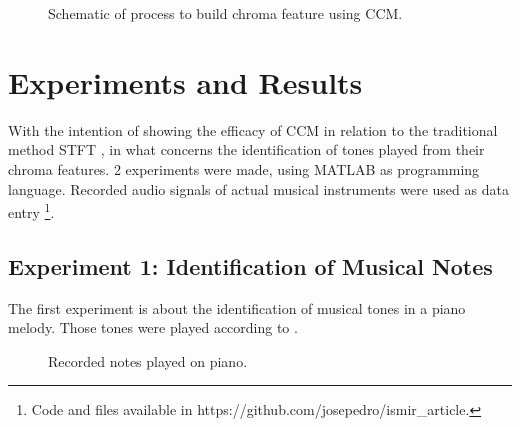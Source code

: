 \documentclass{article}
\begin{document}
	\begin{figure}[h!]
	 \centerline{}
	 \caption{Schematic of process to build chroma feature using CCM.}
	 \label{fig:schematic}
	\end{figure}


\section{Experiments and Results}

	With the intention of showing  the efficacy of CCM in relation to the traditional method STFT \cite{LabROSA}, in what concerns the identification of tones played from their chroma features. 2 experiments were made, using MATLAB as programming language. Recorded audio signals of actual musical instruments were used as data entry \footnote{Code and files available in https://github.com/josepedro/ismir\_article.}. 

	
	\subsection{Experiment 1: Identification of Musical Notes}

	The first experiment is about the identification of musical tones in a piano melody. Those tones were played according to .

	\begin{figure}[h!]
	 \centerline{}
	 \caption{Recorded notes played on piano.}
	 \label{fig:1-notes}
	\end{figure}
\end{document}
